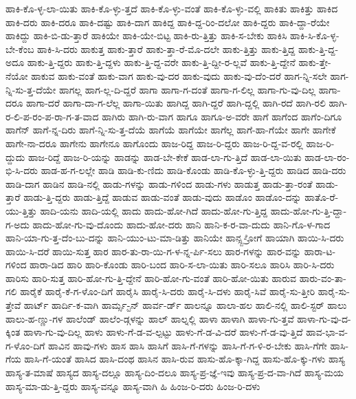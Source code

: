 {ಹಾಕಿ-ಕೊ-ಳ್ಳ-ಲಾ-ಯಿತು
ಹಾಕಿ-ಕೊ-ಳ್ಳು-ತ್ತದೆ
ಹಾಕಿ-ಕೊ-ಳ್ಳು-ವಂತೆ
ಹಾಕಿ-ಕೊ-ಳ್ಳು-ವಲ್ಲಿ
ಹಾಕಿತು
ಹಾಕಿತ್ತು
ಹಾಕಿದ
ಹಾಕಿ-ದರು
ಹಾಕಿ-ದರೂ
ಹಾಕಿ-ದಷ್ಟು
ಹಾಕಿ-ದಾಗ
ಹಾಕಿದ್ದ
ಹಾಕಿ-ದ್ದ-ರಿಂ-ದಲೋ
ಹಾಕಿ-ದ್ದರು
ಹಾಕಿ-ದ್ದಾ-ರೆಯೇ
ಹಾಕಿದ್ದು
ಹಾಕಿ-ಬಿ-ಡು-ತ್ತಾರೆ
ಹಾಕಿಯೇ
ಹಾಕಿ-ಯೇ-ಬಿಟ್ಟ
ಹಾಕಿ-ರು-ತ್ತಿತ್ತು
ಹಾಕಿ-ಸ-ಬೇಕು
ಹಾಕಿಸಿ
ಹಾಕಿ-ಸಿ-ಕೊ-ಳ್ಳ-ಬೇ-ಕೆಂಬ
ಹಾಕಿ-ಸಿ-ದರು
ಹಾಕುತ್ತ
ಹಾಕು-ತ್ತಾರೆ
ಹಾಕು-ತ್ತಾ-ರೆ-ಮೊ-ದಲೇ
ಹಾಕು-ತ್ತಿತ್ತು
ಹಾಕು-ತ್ತಿದ್ದ
ಹಾಕು-ತ್ತಿ-ದ್ದ-ಅದೂ
ಹಾಕು-ತ್ತಿ-ದ್ದರು
ಹಾಕು-ತ್ತಿ-ದ್ದಳು
ಹಾಕು-ತ್ತಿ-ದ್ದ-ವರೇ
ಹಾಕು-ತ್ತಿ-ದ್ದೀ-ರ-ಲ್ಲವೆ
ಹಾಕು-ತ್ತಿ-ದ್ದೇನೆ
ಹಾಕು-ತ್ತೇ-ನೆಯೋ
ಹಾಕುವ
ಹಾಕು-ವಂತೆ
ಹಾಕು-ವಾಗ
ಹಾಕು-ವು-ದರ
ಹಾಕು-ವುದು
ಹಾಕು-ವು-ದೆಂ-ದರೆ
ಹಾಗ-ನ್ನಿ-ಸಲೇ
ಹಾಗ-ನ್ನಿ-ಸು-ತ್ತ-ದೆಯೇ
ಹಾಗಲ್ಲ
ಹಾಗ-ಲ್ಲ-ದಿ-ದ್ದರೆ
ಹಾಗಾ
ಹಾಗಾ-ಗ-ದಂತೆ
ಹಾಗಾ-ಗ-ಲಿಲ್ಲ
ಹಾಗಾ-ಗು-ವು-ದಿಲ್ಲ
ಹಾಗಾ-ದರೂ
ಹಾಗಾ-ದರೆ
ಹಾಗಾ-ದಾ-ಗ-ಲೆಲ್ಲ
ಹಾಗಾ-ಯಿತು
ಹಾಗಿದ್ದ
ಹಾಗಿ-ದ್ದರೆ
ಹಾಗಿ-ದ್ದಲ್ಲಿ
ಹಾಗಿ-ರದೆ
ಹಾಗಿ-ರಲಿ
ಹಾಗಿ-ರ-ಲಿ-ಪ-ರಂ-ಪ-ರಾ-ಗ-ತ-ವಾದ
ಹಾಗಿರು
ಹಾಗಿ-ರು-ವಾಗ
ಹಾಗೂ
ಹಾಗೂ-ಅ-ವರೇ
ಹಾಗೆ
ಹಾಗೆಂದ
ಹಾಗೆಂ-ದಿಗೂ
ಹಾಗೆನ್
ಹಾಗೆ-ನ್ನ-ದಿರು
ಹಾಗೆ-ನ್ನಿ-ಸು-ತ್ತ-ದೆಯೆ
ಹಾಗೆಯೆ
ಹಾಗೆಯೇ
ಹಾಗೆಲ್ಲ
ಹಾಗೆ-ಹಾ-ಗೆಯೇ
ಹಾಗೇ
ಹಾಗೇಕೆ
ಹಾಗೇ-ನಾ-ದರೂ
ಹಾಗೇನು
ಹಾಗೇನೂ
ಹಾಗೊಂದು
ಹಾಜ-ರಿದ್ದ
ಹಾಜ-ರಿ-ದ್ದರು
ಹಾಜ-ರಿ-ದ್ದ-ವ-ರಲ್ಲಿ
ಹಾಜ-ರಿ-ದ್ದುದು
ಹಾಜ-ರಿದ್ದೆ
ಹಾಜ-ರಿ-ಯನ್ನು
ಹಾಡನ್ನು
ಹಾಡ-ಬೇ-ಕೇಕೆ
ಹಾಡ-ಲಾ-ಗು-ತ್ತಿದೆ
ಹಾಡ-ಲಾ-ಯಿತು
ಹಾಡ-ಲಾ-ರಂ-ಭಿ-ಸಿ-ದರು
ಹಾಡ-ಹ-ಗ-ಲಲ್ಲೇ
ಹಾಡಿ
ಹಾಡಿ-ಕು-ಣಿದು
ಹಾಡಿ-ಕೊಂಡು
ಹಾಡಿ-ಕೊ-ಳ್ಳು-ತ್ತಿ-ದ್ದರು
ಹಾಡಿದ
ಹಾಡಿ-ದರು
ಹಾಡಿ-ದಾಗ
ಹಾಡಿನ
ಹಾಡಿ-ನಲ್ಲಿ
ಹಾಡು-ಗಳನ್ನು
ಹಾಡು-ಗಳಿಂದ
ಹಾಡು-ಗಳು
ಹಾಡುತ್ತ
ಹಾಡು-ತ್ತಾ-ರಂತೆ
ಹಾಡು-ತ್ತಾರೆ
ಹಾಡು-ತ್ತಿ-ದ್ದರು
ಹಾಡು-ತ್ತಿದ್ದೆ
ಹಾಡುವ
ಹಾಡು-ವಂತೆ
ಹಾಡು-ವುದು
ಹಾಡೊಂ
ಹಾಡೊಂ-ದನ್ನು
ಹಾತೊ-ರೆ-ಯು-ತ್ತಿತ್ತು
ಹಾದಿ-ಯನು
ಹಾದಿ-ಯಲ್ಲಿ
ಹಾದು
ಹಾದು-ಹೋ-ಗಿದೆ
ಹಾದು-ಹೋ-ಗು-ತ್ತಿದ್ದ
ಹಾದು-ಹೋ-ಗು-ತ್ತಿ-ದ್ದಾ-ಗ-ಅದು
ಹಾದು-ಹೋ-ಗು-ವು-ದೊಂದು
ಹಾದು-ಹೋ-ದರು
ಹಾನಿ
ಹಾನಿ-ಕ-ರ-ವಾ-ದುದು
ಹಾನಿ-ಗೊ-ಳ-ಗಾದ
ಹಾನಿ-ಯಾ-ಗು-ತ್ತ-ದೆಂ-ಬು-ದನ್ನು
ಹಾನಿ-ಯುಂ-ಟು-ಮಾ-ಡಿತ್ತು
ಹಾನಿಯೇ
ಹಾನ್ಸ್ಬ-್ರೋಗೆ
ಹಾಯಾಗಿ
ಹಾಯಿ-ಸಿ-ದರು
ಹಾಯಿ-ಸಿ-ದರೆ
ಹಾಯಿ-ಸುತ್ತ
ಹಾರ
ಹಾರ-ತು-ರಾ-ಯಿ-ಗ-ಳ-ನ್ನ-ರ್ಪಿ-ಸಲು
ಹಾರ-ಗಳನ್ನು
ಹಾರ-ವನ್ನು
ಹಾರಾ-ಟ-ಗಳಿಂದ
ಹಾರಾ-ಡಿದ
ಹಾರಿ
ಹಾರಿ-ಕೊಂಡು
ಹಾರಿ-ಬಂದ
ಹಾರಿ-ಸ-ಲಾ-ಯಿತು
ಹಾರಿ-ಸಲೂ
ಹಾರಿಸಿ
ಹಾರಿ-ಸಿ-ದರು
ಹಾರಿಸು
ಹಾರಿ-ಸುತ್ತ
ಹಾರಿ-ಹೋ-ಗು-ತ್ತಿ-ದ್ದೇನೆ
ಹಾರಿ-ಹೋ-ಗು-ವಂತೆ
ಹಾರಿ-ಹೋ-ಯಿತು
ಹಾರುವ
ಹಾರು-ವಂ-ತಾ-ಗಲಿ
ಹಾರೈಕೆ
ಹಾರೈ-ಕೆ-ಗ-ಳೊಂ-ದಿಗೆ
ಹಾರೈಸಿ
ಹಾರೈ-ಸಿ-ದರು
ಹಾರೈ-ಸಿ-ದಳು
ಹಾರೈ-ಸಿವೆ
ಹಾರೈ-ಸು-ತ್ತೀರಿ
ಹಾರೈ-ಸು-ತ್ತೇವೆ
ಹಾರ್ಟ್
ಹಾರ್ದಿ-ಕ-ವಾಗಿ
ಹಾರ್ಮ್ಸ-್ಟನ್
ಹಾರ್ವ-ರ್ಡ್
ಹಾಲನ್ನೂ
ಹಾಲಾ-ಹಲ
ಹಾಲಿ-ನಲ್ಲಿ
ಹಾಲಿ-ಸ್ಟರ್
ಹಾಲು
ಹಾಲು-ಹ-ಣ್ಣು-ಗಳ
ಹಾಲೆಂಡ್
ಹಾಲೆಂ-ಡ್ಗಳನ್ನು
ಹಾಲ್
ಹಾಲ್ನಲ್ಲಿ
ಹಾಳಾ
ಹಾಳಾಗಿ
ಹಾಳಾ-ಗು-ತ್ತವೆ
ಹಾಳಾ-ಗು-ವು-ದ-ಕ್ಕಿಂತ
ಹಾಳಾ-ಗು-ವು-ದಿಲ್ಲ
ಹಾಳು
ಹಾಳು-ಗೆ-ಡ-ವ-ಲ್ಪಟ್ಟು
ಹಾಳು-ಗೆ-ಡ-ವಿ-ದರೆ
ಹಾಳು-ಗೆ-ಡ-ವು-ತ್ತಿದೆ
ಹಾವ-ಭಾ-ವ-ಗ-ಳೊಂ-ದಿಗೆ
ಹಾವಿನ
ಹಾವು-ಗಳು
ಹಾಸ
ಹಾಸಿ
ಹಾಸಿಗೆ
ಹಾಸಿ-ಗೆ-ಗಳನ್ನು
ಹಾಸಿ-ಗೆ-ಗ-ಳಿ-ರ-ಬೇಕು
ಹಾಸಿ-ಗೆಗೇ
ಹಾಸಿ-ಗೆಯ
ಹಾಸಿ-ಗೆ-ಯಂತೆ
ಹಾಸಿದ
ಹಾಸಿ-ದಂಥ
ಹಾಸಿನ
ಹಾಸಿ-ರುವ
ಹಾಸು-ಹೊ-ಕ್ಕಾ-ಗಿದ್ದ
ಹಾಸು-ಹೊ-ಕ್ಕು-ಗಳು
ಹಾಸ್ಯ
ಹಾಸ್ಯ-ತ-ಮಾಷೆ
ಹಾಸ್ಯದ
ಹಾಸ್ಯ-ದಲ್ಲೂ
ಹಾಸ್ಯ-ದಿಂ-ದಲೂ
ಹಾಸ್ಯ-ಪ್ರ-ಜ್ಞೆ-ಇವು
ಹಾಸ್ಯ-ಪ್ರ-ದ-ವಾ-ಗಿದೆ
ಹಾಸ್ಯ-ಮಯ
ಹಾಸ್ಯ-ಮಾ-ಡು-ತ್ತಿ-ದ್ದರು
ಹಾಸ್ಯ-ವನ್ನೂ
ಹಾಸ್ಯ-ವಾಗಿ
ಹಿ
ಹಿಂಜ-ರಿ-ದರು
ಹಿಂಜ-ರಿ-ದಳು
}
